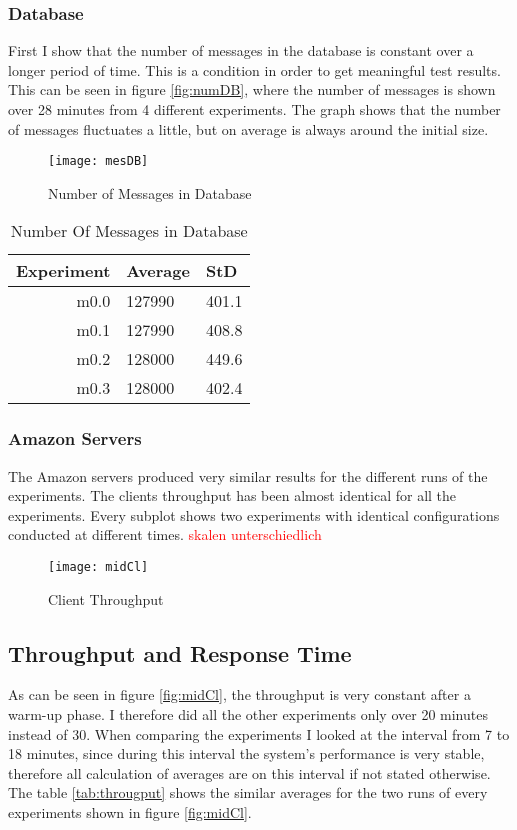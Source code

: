 \documentclass[
10pt, %
a4paper, %
oneside, %
headinclude,footinclude, %
BCOR5mm, %
]{scrartcl}
\newcommand\TODO[1]{\textcolor{red}{#1}}
\begin{document}
\subsubsection{Database}
First I show that the number of messages in the database is constant over a longer period of time. This is a condition in order to get meaningful test results. This can be seen in figure \vref{fig:numDB}, where the number of messages is shown over 28 minutes from 4 different experiments. The graph shows that the number of messages fluctuates a little, but on average is always around the initial size.

\begin{figure}[H]
\centering
\texttt{[image: mesDB]}
\caption{Number of Messages in Database}
\label{fig:numDB}
\end{figure}

\begin{table}[H]

\caption{Number Of Messages in Database}
\centering
\begin{tabular}{|r|l|l|}
\toprule
Experiment & Average & StD\\
\midrule
m0.0	&	127990	&	401.1\\
m0.1 	&	127990	&	408.8\\
m0.2 	&	128000 	& 	449.6\\
m0.3 	& 	128000 	& 	402.4\\
\bottomrule
\end{tabular}
\label{tab:numb}
\end{table}

\subsubsection{Amazon Servers}
The Amazon servers produced very similar results for the different runs of the experiments. The clients throughput has been almost identical for all the experiments. Every subplot shows two experiments with identical configurations conducted at different times.
\TODO{skalen unterschiedlich}
\begin{figure}[H]
\centering
\texttt{[image: midCl]}
\caption{Client Throughput}
\label{fig:midCl}
\end{figure}

\subsection{Throughput and Response Time}
As can be seen in figure \vref{fig:midCl}, the throughput is very constant after a warm-up phase. I therefore did all the other experiments only over 20 minutes instead of 30. When comparing the experiments I looked at the interval from 7 to 18 minutes, since during this interval the system's performance is very stable, therefore all calculation of averages are on this interval if not stated otherwise. 
The table \vref{tab:througput} shows the similar averages for the two runs of every experiments shown in figure \vref{fig:midCl}. 
\end{document}
